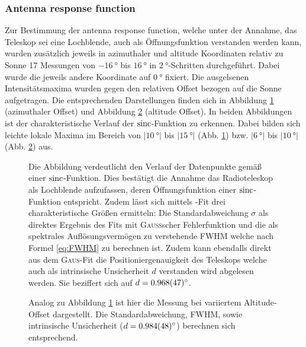 \subsubsection{Antenna response function}
    Zur Bestimmung der \dq antenna response function\dq{},
    welche unter der Annahme, das Teleskop sei eine Lochblende, auch als Öffnungsfunktion verstanden werden kann,
    wurden zusätzlich jeweils in azimuthaler und altitude Koordinaten relativ zu Sonne 17 Messungen von $\SI{-16}{\degree}$ bis $\SI{16}{\degree}$ in $\SI{2}{\degree}$-Schritten durchgeführt.
    Dabei wurde die jeweils andere Koordinate auf $\SI{0}{\degree}$ fixiert.
    Die ausgelsenen Intensitätsmaxima wurden gegen den relativen Offset bezogen auf die Sonne aufgetragen.
    Die entsprechenden Darstellungen finden sich in Abbildung \ref{fig:Sonnenkreuz_Az} (azimuthaler Offset) und Abbildung \ref{fig:Sonnenkreuz_Alt} (altitude Offset).
    In beiden Abbildungen ist der charakteristische Verlauf der $\operatorname{sinc}$-Funktion zu erkennen.
    Dabei bilden sich leichte lokale Maxima im Bereich von $\vert\SI{10}{\degree}\vert$ bis $\vert\SI{15}{\degree}\vert$ (Abb. \ref{fig:Sonnenkreuz_Az}) bzw. $\vert\SI{6}{\degree}\vert$ bis $\vert\SI{10}{\degree}\vert$ (Abb. \ref{fig:Sonnenkreuz_Alt}) aus.
    \begin{figure}[H]
        \centering
        
        \caption[Kreuz-Scan der Sonne, Azimuthaler Offset]{Die Abbildung verdeutlicht den Verlauf der Datenpunkte gemäß einer $\operatorname{sinc}$-Funktion. Dies bestätigt die Annahme das Radioteleskop als Lochblende aufzufassen, deren Öffnungsfunktion einer $\operatorname{sinc}$-Funktion entspricht. Zudem lässt sich mittels -Fit drei charakteristische Größen ermitteln: Die Standardabweichung $\sigma$ als direktes Ergebnis des Fits mit \textsc{Gauß}scher Fehlerfunktion und die als spektrales Auflösungsvermögen zu verstehende FWHM welche nach Formel \eqref{eq:FWHM} zu berechnen ist. Zudem kann ebendalls direkt aus dem \textsc{Gaus}-Fit die Positioniergenauigkeit des Teleskops welche auch als intrinsische Unsicherheit $d$ verstanden wird abgelesen werden. Sie beziffert sich auf $d = \SI{0.968 \pm 0.047}{\degree}$.}
        \label{fig:Sonnenkreuz_Az}
    \end{figure}
    \begin{figure}[H]
        \centering
        
        \caption[Kreuz-Scan der Sonne, Altitude Offset]{Analog zu Abbildung \ref{fig:Sonnenkreuz_Az} ist hier die Messung bei variiertem Altitude-Offset dargestellt. Die Standardabweichung, FWHM, sowie intrinsische Unsicherheit ($d = \SI{0.984 \pm 0.048}{\degree}$) berechnen sich entsprechend.}
        \label{fig:Sonnenkreuz_Alt}
    \end{figure}

